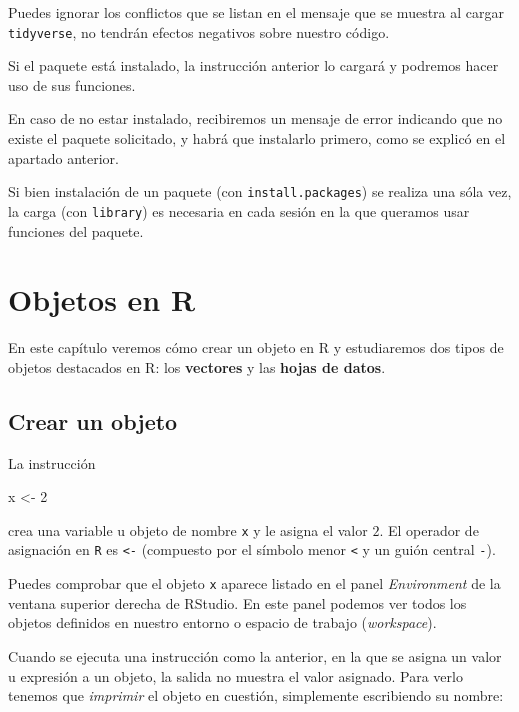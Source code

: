 \documentclass[
  degree=mecinf,
  title=normal,
  toc=normal,
  bib=normal]{mnye}
\newenvironment{Shaded}{\begin{snugshade}}{\end{snugshade}}
\newcommand{\DecValTok}[1]{\textcolor[rgb]{0.00,0.00,0.81}{#1}}
\newcommand{\NormalTok}[1]{#1}
\newcommand{\OtherTok}[1]{\textcolor[rgb]{0.56,0.35,0.01}{#1}}
\begin{document}
Puedes ignorar los conflictos que se listan en el mensaje que se muestra al cargar \texttt{tidyverse}, no tendrán efectos negativos sobre nuestro código.

Si el paquete está instalado, la instrucción anterior lo cargará y podremos hacer uso de sus funciones.

En caso de no estar instalado, recibiremos un mensaje de error indicando que no existe el paquete solicitado, y habrá que instalarlo primero, como se explicó en el apartado anterior.

Si bien instalación de un paquete (con \texttt{install.packages}) se realiza una sóla vez, la carga (con \texttt{library}) es necesaria en cada sesión en la que queramos usar funciones del paquete.

\hypertarget{objects}{%
\section{Objetos en R}\label{objects}}

En este capítulo veremos cómo crear un objeto en \textsf{R} y estudiaremos dos tipos de objetos destacados en \textsf{R}: los \textbf{vectores} y las \textbf{hojas de datos}.

\hypertarget{crear-un-objeto}{%
\subsection{Crear un objeto}\label{crear-un-objeto}}

La instrucción

\begin{Shaded}
\begin{Highlighting}[]
\NormalTok{x }\OtherTok{\textless{}{-}} \DecValTok{2}
\end{Highlighting}
\end{Shaded}

crea una variable u objeto de nombre \texttt{x} y le asigna el valor \(2\).
El operador de asignación en \texttt{R} es \texttt{\textless{}-} (compuesto por el símbolo menor \texttt{\textless{}} y un guión central \texttt{-}).

Puedes comprobar que el objeto \texttt{x} aparece listado en el panel \emph{Environment} de la ventana superior derecha de \textsf{RStudio}. En este panel podemos ver todos los objetos definidos en nuestro entorno o espacio de trabajo (\emph{workspace}).

Cuando se ejecuta una instrucción como la anterior, en la que se asigna un valor u expresión a un objeto, la salida no muestra el valor asignado. Para verlo tenemos que \emph{imprimir} el objeto en cuestión, simplemente escribiendo su nombre:
\end{document}
